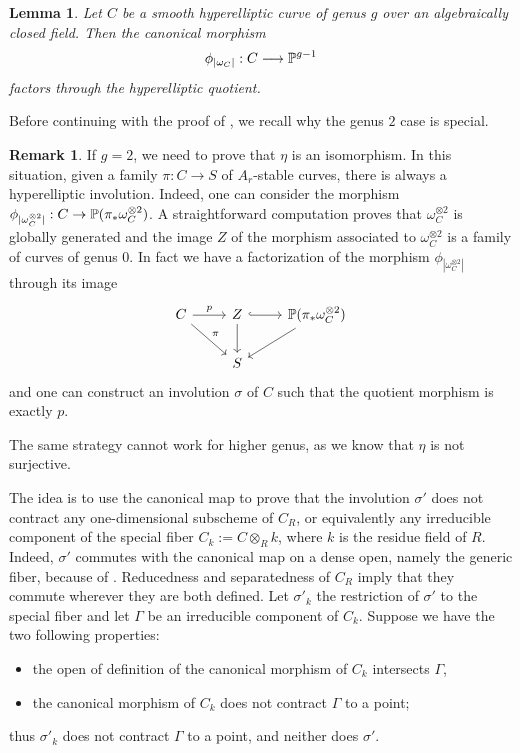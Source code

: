 \documentclass{alggeom}
\numberwithin{equation}{section}
\numberwithin{subsection}{section}
\newtheorem{lemma}[theorem]{Lemma}
\theoremstyle{definition}
\newtheorem{remark}[theorem]{Remark}
\theoremstyle{remark}
\begin{document}
\begin{lemma}\label{lem:can-com}
	Let $C$ be a smooth hyperelliptic curve of genus $g$ over an algebraically closed field. Then the canonical morphism $$\phi_{|\omega_C|}:C\longrightarrow \mathbb{P}^{g-1}$$
	factors through the hyperelliptic quotient.
\end{lemma}

Before continuing with the proof of , we recall why the genus $2$ case is special.

\begin{remark}	\label{rem:genus-2}
	If $g=2$, we need to prove that $\eta$ is an isomorphism.  In this situation, given a family $\pi:C\rightarrow S$ of $A_r$-stable curves, there is always a hyperelliptic involution. Indeed, one can consider the morphism $\phi_{|\omega_C^{\otimes 2}|}:C \rightarrow \mathbb{P}(\pi_*\omega_C^{\otimes 2}) $. A straightforward computation proves that $\omega_C^{\otimes 2}$ is globally generated and the image $Z$ of the morphism associated to $\omega_C^{\otimes 2}$ is a family of curves of genus $0$. In fact we have a factorization of the morphism $\phi_{|\omega_C^{\otimes 2}|}$ through its image
	$$
	\begin{tikzcd}
	C \arrow[rd,"\pi"]  \arrow[r, "p"] & Z \arrow[d] \arrow[r, hook] & \PP(\pi_*\omega_C^{\otimes 2}) \arrow[ld]   \\
		& S              &                               
		\end{tikzcd}$$
	and one can construct an involution $\sigma$ of $C$ such that the quotient morphism is exactly $p$. 
	
	The same strategy cannot work for higher genus, as we know that $\eta$ is not surjective.  
\end{remark}

The idea is to use the canonical map to prove that the involution $\sigma'$ does not contract any one-dimensional subscheme of $C_R$, or equivalently any irreducible component of the special fiber $C_k:=C\otimes_R k$, where $k$ is the residue field of $R$. Indeed, $\sigma'$ commutes with the canonical map on a dense open, namely the generic fiber, because of . Reducedness and separatedness of $C_R$ imply that they commute wherever they are both defined. Let $\sigma'_k$ the restriction of $\sigma'$ to the special fiber and let $\Gamma$ be an irreducible component of $C_k$. Suppose we have the two following properties:
\begin{itemize}
	\item[1)] the open of definition of the canonical morphism of $C_k$ intersects $\Gamma$,
	\item[2)] the canonical morphism of $C_k$ does not contract $\Gamma$ to a point;
\end{itemize}
thus $\sigma'_k$ does not contract $\Gamma$ to a point, and neither does $\sigma'$. 
\end{document}
